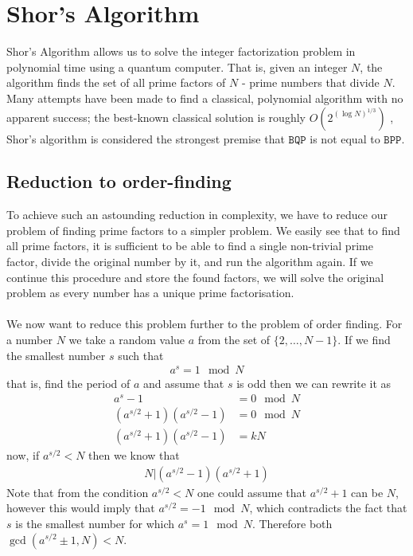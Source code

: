 \section{Shor's Algorithm}
Shor's Algorithm allows us to solve the integer factorization problem in polynomial time using a quantum computer. That is, given an integer $N$, the algorithm finds the set of all prime factors of $N$ - prime numbers that divide $N$. Many attempts have been made to find a classical, polynomial algorithm with no apparent success; the best-known classical solution is roughly $O(2^{(\log N)^{1/3}})$ \cite{thebook}, Shor's algorithm is considered the strongest premise that $\mathtt{BQP}$ is not equal to $\mathtt{BPP}$.
\subsection{Reduction to order-finding}
To achieve such an astounding reduction in complexity, we have to reduce our problem of finding prime factors to a simpler problem. We easily see that to find all prime factors, it is sufficient to be able to find a single non-trivial prime factor, divide the original number by it, and run the algorithm again. If we continue this procedure and store the found factors, we will solve the original problem as every number has a unique prime factorisation.
\\\\
We now want to reduce this problem further to the problem of order finding. For a number $N$ we take a random value $a$ from the set of $\{2,\dots,N-1\}$. If we find the smallest number $s$ such that
\begin{align*}
    a^s=1\mod{N}
\end{align*}
that is, find the period of $a$ and assume that $s$ is odd then we can rewrite it as  
\begin{align*}
    a^s-1&=0 \mod{N}\\
    (a^{s/2}+1)(a^{s/2}-1)&=0 \mod{N}\\
    (a^{s/2}+1)(a^{s/2}-1)&=kN
\end{align*}
now, if $a^{s/2}<N$ then we know that  
\begin{align*}
    N|(a^{s/2}-1)(a^{s/2}+1)
\end{align*}
Note that from the condition $a^{s/2}<N$ one could assume that $a^{s/2}+1$ can be $N$, however this would imply that $a^{s/2}=-1 \mod{N}$, which contradicts the fact that $s$ is the smallest number for which $a^{s}=1 \mod{N}$. Therefore both $\gcd(a^{s/2}\pm 1,N)<N$.
\\\\
